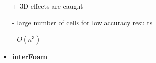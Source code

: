 \begin{frame}
\begin{minipage}{0.35\textwidth}
\begin{tcolorbox} [
colframe=TUMOrange,
colback=TUMOrange!50,
title = \centering Navier-Stokes\\3D]     
\begin{itemize}
\item[+] 3D effects are caught
\item[-] large number of cells for low accuracy results
\item[-] $O(n^3)$\vspace{0.6cm}
\item<2-> \large \textbf{interFoam}
\end{itemize}
\end{tcolorbox}    
\end{minipage}


 \end{frame}




